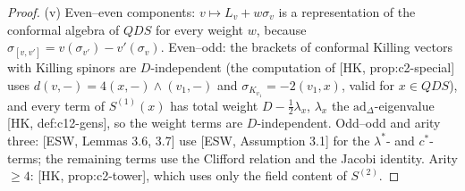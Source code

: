 \documentclass[11pt]{article}
\theoremstyle{definition}
\numberwithin{equation}{section}
\begin{document}
\begin{proof}
(v) Even--even components: $v\mapsto L_v+w\sigma_v$ is a representation of the conformal algebra of $QDS$ for every weight $w$, because $\sigma_{[v,v']}=v(\sigma_{v'})-v'(\sigma_v)$. Even--odd: the brackets of conformal Killing vectors with Killing spinors are $D$-independent (the computation of [HK, prop:c2-special] uses $d(v,-)=4(x,-)\wedge(v_1,-)$ and $\sigma_{K_{v_1}}=-2(v_1,x)$, valid for $x\in QDS$), and every term of $S^{(1)}(x)$ has total weight $D-\frac12\lambda_x$, $\lambda_x$ the $\mathrm{ad}_\Delta$-eigenvalue [HK, def:c12-gens], so the weight terms are $D$-independent. Odd--odd and arity three: [ESW, Lemmas 3.6, 3.7] use [ESW, Assumption 3.1] for the $\lambda^*$- and $c^*$-terms; the remaining terms use the Clifford relation and the Jacobi identity. Arity $\ge4$: [HK, prop:c2-tower], which uses only the field content of $S^{(2)}$.
\end{proof}
\end{document}
